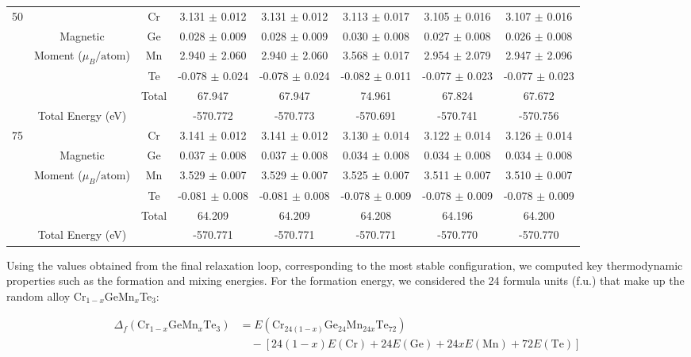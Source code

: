 \begin{table}[H]
{\begin{tabular}{cccccccc}
			\midrule
			\midrule
			\multirow{5}{*}{50} & & Cr & 3.131 $\pm$ 0.012 & 3.131 $\pm$ 0.012 & 3.113 $\pm$ 0.017 & 3.105 $\pm$ 0.016 & 3.107 $\pm$ 0.016 \\
			& Magnetic & Ge & 0.028 $\pm$ 0.009 & 0.028 $\pm$ 0.009 & 0.030 $\pm$ 0.008 & 0.027 $\pm$ 0.008 & 0.026 $\pm$ 0.008 \\ 
			& Moment ($\mu_B / \text{atom}$) & Mn & 2.940 $\pm$ 2.060 & 2.940 $\pm$ 2.060 & 3.568 $\pm$ 0.017 & 2.954 $\pm$ 2.079 & 2.947 $\pm$ 2.096 \\ 
			& & Te & -0.078 $\pm$ 0.024 & -0.078 $\pm$ 0.024 & -0.082 $\pm$ 0.011 & -0.077 $\pm$ 0.023 & -0.077 $\pm$ 0.023 \\ 
			& & Total & 67.947 & 67.947 & 74.961 & 67.824 & 67.672 \\ 
			\midrule
			& Total Energy (eV) & & -570.772 & -570.773 & -570.691 & -570.741 & -570.756 \\ 		     
			\midrule
			\midrule
			\multirow{5}{*}{75} & & Cr & 3.141 $\pm$ 0.012 & 3.141 $\pm$ 0.012 & 3.130 $\pm$ 0.014 & 3.122 $\pm$ 0.014 & 3.126 $\pm$ 0.014 \\
			& Magnetic & Ge & 0.037 $\pm$ 0.008 & 0.037 $\pm$ 0.008 & 0.034 $\pm$ 0.008 & 0.034 $\pm$ 0.008 & 0.034 $\pm$ 0.008 \\ 
			& Moment ($\mu_B / \text{atom}$) & Mn & 3.529 $\pm$ 0.007 & 3.529 $\pm$ 0.007 & 3.525 $\pm$ 0.007 & 3.511 $\pm$ 0.007 & 3.510 $\pm$ 0.007 \\ 
			& & Te & -0.081 $\pm$ 0.008 & -0.081 $\pm$ 0.008 & -0.078 $\pm$ 0.009 & -0.078 $\pm$ 0.009 & -0.078 $\pm$ 0.009 \\ 
			& & Total & 64.209 & 64.209 & 64.208 & 64.196 & 64.200 \\ 
			\midrule
			& Total Energy (eV) & & -570.771 & -570.771 & -570.771 & -570.770 & -570.770 \\ 		     
			\bottomrule
			\bottomrule
	\end{tabular}}
	\label{tab:4.13}
\end{table}

Using the values obtained from the final relaxation loop, corresponding to the most stable configuration, we computed key thermodynamic properties such as the formation and mixing energies. For the formation energy, we considered the 24 formula units (f.u.) that make up the random alloy Cr$_{1-x}$GeMn$_{x}$Te$_{3}$:

\begin{align*}
	\Delta_f(\text{Cr}_{1-x}\text{GeMn}_{x}\text{Te}_{3}) &= E(\text{Cr}_{24(1-x)}\text{Ge}_{24}\text{Mn}_{24x}\text{Te}_{72}) \\
	&\quad - \left[ 24(1-x)E(\text{Cr}) + 24E(\text{Ge}) + 24xE(\text{Mn}) + 72E(\text{Te}) \right]
\end{align*}

